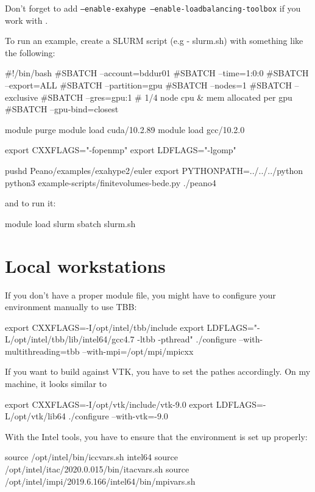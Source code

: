 \noindent
Don't forget to add \texttt{--enable-exahype --enable-loadbalancing-toolbox} if
you work with \ExaHyPE.

To run an example, create a SLURM script (e.g - slurm.sh) with something like the following:
\begin{code}
#!/bin/bash
#SBATCH --account=bddur01
#SBATCH --time=1:0:0
#SBATCH --export=ALL
#SBATCH --partition=gpu
#SBATCH --nodes=1
#SBATCH --exclusive
#SBATCH --gres=gpu:1  # 1/4 node cpu & mem allocated per gpu
#SBATCH --gpu-bind=closest

 module purge
 module load cuda/10.2.89
 module load gcc/10.2.0

 export CXXFLAGS="-fopenmp"
 export LDFLAGS="-lgomp"

 pushd Peano/examples/exahype2/euler
 export PYTHONPATH=../../../python
 python3 example-scripts/finitevolumes-bede.py
 ./peano4
\end{code}

and to run it:
\begin{code}
  module load slurm
  sbatch slurm.sh
\end{code}

\section{Local workstations}



If you don't have a proper module file, you might have to configure your environment manually to use TBB:
\begin{code}
 export CXXFLAGS=-I/opt/intel/tbb/include
 export LDFLAGS="-L/opt/intel/tbb/lib/intel64/gcc4.7 -ltbb -pthread"
 ./configure --with-multithreading=tbb --with-mpi=/opt/mpi/mpicxx
\end{code}


If you want to build against VTK, you have to set the pathes accordingly. 
On my machine, it looks similar to
\begin{code}
 export CXXFLAGS=-I/opt/vtk/include/vtk-9.0
 export LDFLAGS=-L/opt/vtk/lib64
 ./configure --with-vtk=-9.0
\end{code}


With the Intel tools, you have to ensure that the environment is set up 
properly:
\begin{code}
source /opt/intel/bin/iccvars.sh intel64
source /opt/intel/itac/2020.0.015/bin/itacvars.sh
source /opt/intel/impi/2019.6.166/intel64/bin/mpivars.sh
\end{code}
\label{label:supercomputer:Intel-scripts}


